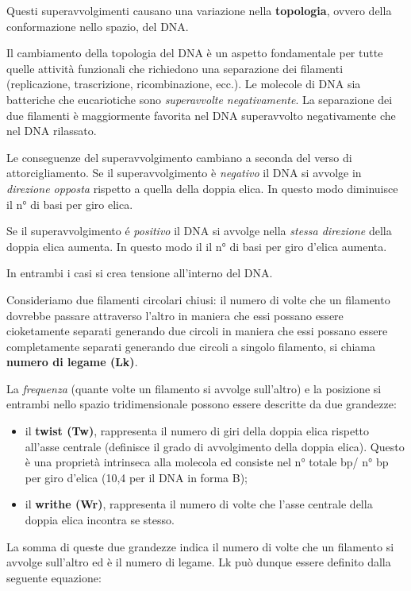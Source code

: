 \documentclass[11pt]{book}
\begin{document}
Questi superavvolgimenti causano una variazione nella
\textbf{topologia}, ovvero della conformazione nello spazio, del DNA.

Il cambiamento della topologia del DNA è un aspetto fondamentale per
tutte quelle attività funzionali che richiedono una separazione dei
filamenti (replicazione, trascrizione, ricombinazione, ecc.). Le
molecole di DNA sia batteriche che eucariotiche sono \emph{superavvolte
negativamente}. La separazione dei due filamenti è maggiormente favorita
nel DNA superavvolto negativamente che nel DNA rilassato.

Le conseguenze del superavvolgimento cambiano a seconda del verso di
attorcigliamento. Se il superavvolgimento è \emph{negativo} il DNA si
avvolge in \emph{direzione opposta} rispetto a quella della doppia
elica. In questo modo diminuisce il n° di basi per giro elica.

Se il superavvolgimento é \emph{positivo} il DNA si avvolge nella
\emph{stessa direzione} della doppia elica aumenta. In questo modo il il
n° di basi per giro d'elica aumenta.

In entrambi i casi si crea tensione all'interno del DNA.

Consideriamo due filamenti circolari chiusi: il numero di volte che un
filamento dovrebbe passare attraverso l'altro in maniera che essi
possano essere cioketamente separati generando due circoli in maniera
che essi possano essere completamente separati generando due circoli a
singolo filamento, si chiama \textbf{numero di legame (Lk)}.

La \emph{frequenza} (quante volte un filamento si avvolge sull'altro) e
la posizione si entrambi nello spazio tridimensionale possono essere
descritte da due grandezze:

\begin{itemize}
\itemsep1pt\parskip0pt
\item
  il \textbf{twist (Tw)}, rappresenta il numero di giri della doppia
  elica rispetto all'asse centrale (definisce il grado di avvolgimento
  della doppia elica). Questo è una proprietà intrinseca alla molecola
  ed consiste nel n° totale bp/ n° bp per giro d'elica (10,4 per il DNA
  in forma B);
\item
  il \textbf{writhe (Wr)}, rappresenta il numero di volte che l'asse
  centrale della doppia elica incontra se stesso.
\end{itemize}

La somma di queste due grandezze indica il numero di volte che un
filamento si avvolge sull'altro ed è il numero di legame. Lk può dunque
essere definito dalla seguente equazione:
\end{document}

